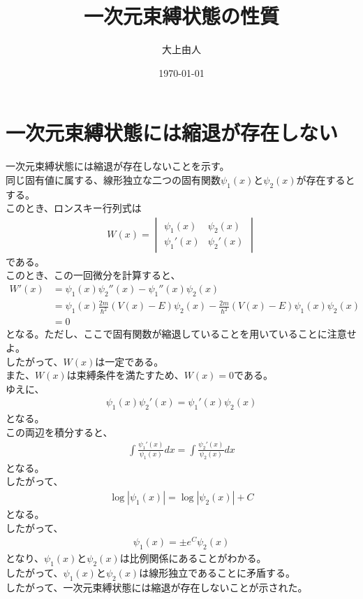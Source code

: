 \documentclass[a4paper,11pt]{jsarticle}
\begin{document}
\title{一次元束縛状態の性質}
\author{大上由人}
\date{\today}
\maketitle
\section{一次元束縛状態には縮退が存在しない}
一次元束縛状態には縮退が存在しないことを示す。\\
同じ固有値に属する、線形独立な二つの固有関数$\psi_1(x)$と$\psi_2(x)$が存在するとする。\\
このとき、ロンスキー行列式は
\begin{align}
    W(x) = \begin{vmatrix}
        \psi_1(x) & \psi_2(x) \\
        \psi_1'(x) & \psi_2'(x)
    \end{vmatrix}
\end{align}
である。\\
このとき、この一回微分を計算すると、
\begin{align}
    W'(x) &= \psi_1(x)\psi_2''(x) - \psi_1''(x)\psi_2(x) \\
    &= \psi_1(x)\frac{2m}{\hbar^2}(V(x) - E)\psi_2(x) - \frac{2m}{\hbar^2}(V(x) - E)\psi_1(x)\psi_2(x) \\
    &= 0
\end{align}
となる。ただし、ここで固有関数が縮退していることを用いていることに注意せよ。\\
したがって、$W(x)$は一定である。\\
また、$W(x)$は束縛条件を満たすため、$W(x) = 0$である。\\
ゆえに、
\begin{align}
    \psi_1(x)\psi_2'(x) = \psi_1'(x)\psi_2(x)
\end{align}
となる。\\
この両辺を積分すると、
\begin{align}
    \int \frac{\psi_1'(x)}{\psi_1(x)}dx = \int \frac{\psi_2'(x)}{\psi_2(x)}dx
\end{align}
となる。\\
したがって、
\begin{align}
    \log|\psi_1(x)| = \log|\psi_2(x)| + C
\end{align}
となる。\\
したがって、
\begin{align}
    \psi_1(x) = \pm e^C\psi_2(x)
\end{align}
となり、$\psi_1(x)$と$\psi_2(x)$は比例関係にあることがわかる。\\
したがって、$\psi_1(x)$と$\psi_2(x)$は線形独立であることに矛盾する。\\
したがって、一次元束縛状態には縮退が存在しないことが示された。
\end{document}
